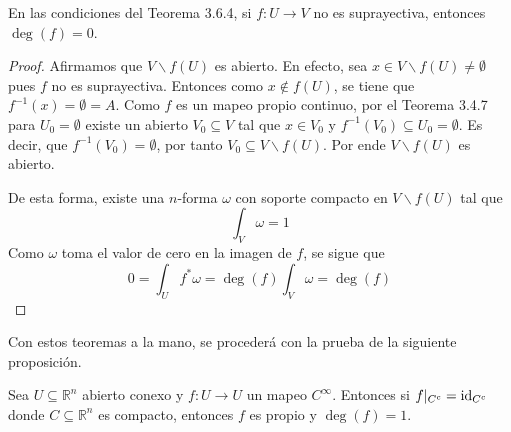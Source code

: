 \documentclass[12pt]{report}
\theoremstyle{largebreak}
\newcommand\cf[3]{\ensuremath{#1:#2\rightarrow#3}}
\begin{document}
\begin{theor}
    En las condiciones del Teorema 3.6.4, si $\cf{f}{U}{V}$ no es suprayectiva, entonces $\deg(f)=0$.
\end{theor}

\begin{proof}
    Afirmamos que $V\backslash f(U)$ es abierto. En efecto, sea $x\in V\backslash f(U)\neq \emptyset$ pues $f$ no es suprayectiva. Entonces como $x\notin f(U)$, se tiene que $f^{-1}(x)=\emptyset=A$. Como $f$ es un mapeo propio continuo, por el Teorema 3.4.7 para $U_0=\emptyset$ existe un abierto $V_0\subseteq V$ tal que $x\in V_0$ y $f^{-1}(V_0)\subseteq U_0=\emptyset$. Es decir, que $f^{-1}(V_0)=\emptyset$, por tanto $V_0\subseteq V\backslash f(U)$. Por ende $V\backslash f(U)$ es abierto.

    De esta forma, existe una $n$-forma $\omega$ con soporte compacto en $V\backslash f(U)$ tal que
    \begin{equation*}
        \int_{V}\omega = 1
    \end{equation*}
    Como $\omega$ toma el valor de cero en la imagen de $f$, se sigue que
    \begin{equation*}
        0=\int_{U}f^*\omega=\deg(f)\int_{V}\omega = \deg(f)
    \end{equation*}
\end{proof}

Con estos teoremas a la mano, se procederá con la prueba de la siguiente proposición.

\begin{propo}
    Sea $U\subseteq \mathbb{R}^n$ abierto conexo y $\cf{f}{U}{U}$ un mapeo $C^{\infty}$. Entonces si $f|_{C^c}=\textup{id}_{C^c}$ donde $C\subseteq\mathbb{R}^n$ es compacto, entonces $f$ es propio y $\deg(f)=1$.
\end{propo}
\end{document}
